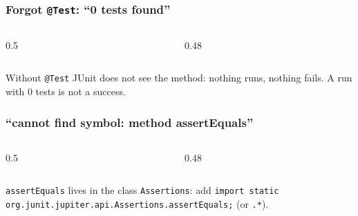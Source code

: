 \documentclass[aspectratio=169,10pt,compress]{beamer}
\begin{document}




\begin{frame}[t,fragile] \frametitle{Forgot \texttt{@Test}: ``0 tests found''}
  \begin{columns}[T]
    \begin{column}{0.5\textwidth}
    \end{column}
    \begin{column}{0.48\textwidth}
    \end{column}
  \end{columns}

  \vspace{0.2em}
  \small Without \texttt{@Test} JUnit does not see the method: nothing runs, nothing fails. A run with 0 tests is not a success.
\end{frame}




\begin{frame}[t,fragile] \frametitle{``cannot find symbol: method assertEquals''}
  \begin{columns}[T]
    \begin{column}{0.5\textwidth}
    \end{column}
    \begin{column}{0.48\textwidth}
    \end{column}
  \end{columns}

  \vspace{0.2em}
  \small \texttt{assertEquals} lives in the class \texttt{Assertions}: add \texttt{import static org.junit.jupiter.api.Assertions.assertEquals;} (or \texttt{.*}).
\end{frame}
\end{document}

